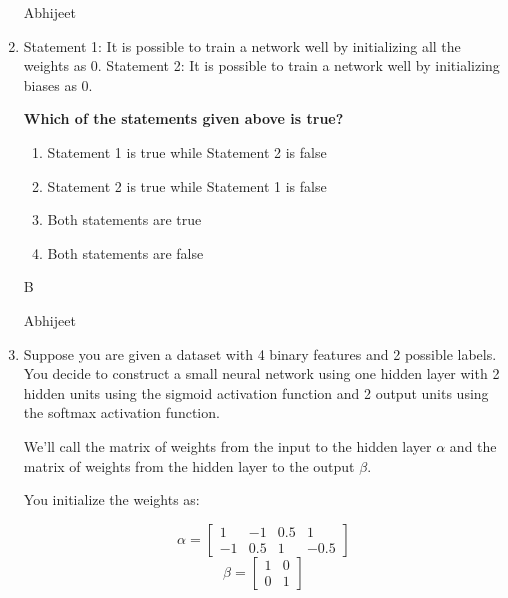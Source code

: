 \begin{enumerate}
        \begin{qauthor}
    Abhijeet 
    \end{qauthor}
    
    
   \item Statement 1: It is possible to train a network well by initializing all the weights as 0.
Statement 2: It is possible to train a network well by initializing biases as 0.

\textbf{Which of the statements given above is true?}
    
\begin{enumerate}
     \item Statement 1 is true while Statement 2 is false
    
     \item Statement 2 is true while Statement 1 is false
    
     \item Both statements are true
    
      \item Both statements are false
     \end{enumerate}    
    
    
     \begin{soln}
    
      B
 
    \end{soln}
    
        \begin{qauthor}
    Abhijeet 
    \end{qauthor}
    
    
    \item Suppose you are given a dataset with 4 binary features and 2 possible labels. You decide to construct a small neural network using one hidden layer with 2 hidden units using the sigmoid activation function and 2 output units using the softmax activation function.
    
    We'll call the matrix of weights from the input to the hidden layer $\alpha$ and the matrix of weights from the hidden layer to the output $\beta$.
    
    You initialize the weights as:
    
    \begin{equation*}
        \alpha = \begin{bmatrix}
        1 & -1 & 0.5 & 1 \\
        -1 & 0.5 & 1 & -0.5
        \end{bmatrix}
    \end{equation*}
    \begin{equation*}
        \beta = \begin{bmatrix}
        1 & 0\\
        0 & 1
        \end{bmatrix}
    \end{equation*}
    

\end{enumerate}
